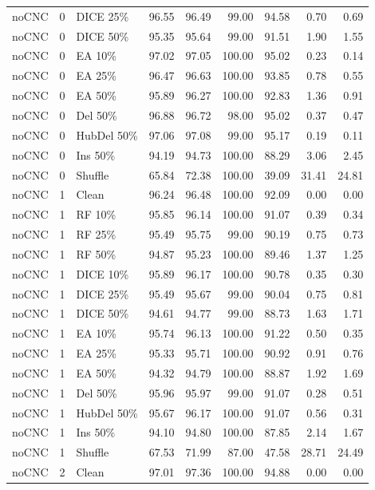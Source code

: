 {\begin{longtable}{rllrrrrrr}
noCNC & 0 & DICE 25\% & 96.55 & 96.49 & 99.00 & 94.58 & 0.70 & 0.69 \\
noCNC & 0 & DICE 50\% & 95.35 & 95.64 & 99.00 & 91.51 & 1.90 & 1.55 \\
noCNC & 0 & EA 10\% & 97.02 & 97.05 & 100.00 & 95.02 & 0.23 & 0.14 \\
noCNC & 0 & EA 25\% & 96.47 & 96.63 & 100.00 & 93.85 & 0.78 & 0.55 \\
noCNC & 0 & EA 50\% & 95.89 & 96.27 & 100.00 & 92.83 & 1.36 & 0.91 \\
noCNC & 0 & Del 50\% & 96.88 & 96.72 & 98.00 & 95.02 & 0.37 & 0.47 \\
noCNC & 0 & HubDel 50\% & 97.06 & 97.08 & 99.00 & 95.17 & 0.19 & 0.11 \\
noCNC & 0 & Ins 50\% & 94.19 & 94.73 & 100.00 & 88.29 & 3.06 & 2.45 \\
noCNC & 0 & Shuffle & 65.84 & 72.38 & 100.00 & 39.09 & 31.41 & 24.81 \\
noCNC & 1 & Clean & 96.24 & 96.48 & 100.00 & 92.09 & 0.00 & 0.00 \\
noCNC & 1 & RF 10\% & 95.85 & 96.14 & 100.00 & 91.07 & 0.39 & 0.34 \\
noCNC & 1 & RF 25\% & 95.49 & 95.75 & 99.00 & 90.19 & 0.75 & 0.73 \\
noCNC & 1 & RF 50\% & 94.87 & 95.23 & 100.00 & 89.46 & 1.37 & 1.25 \\
noCNC & 1 & DICE 10\% & 95.89 & 96.17 & 100.00 & 90.78 & 0.35 & 0.30 \\
noCNC & 1 & DICE 25\% & 95.49 & 95.67 & 99.00 & 90.04 & 0.75 & 0.81 \\
noCNC & 1 & DICE 50\% & 94.61 & 94.77 & 99.00 & 88.73 & 1.63 & 1.71 \\
noCNC & 1 & EA 10\% & 95.74 & 96.13 & 100.00 & 91.22 & 0.50 & 0.35 \\
noCNC & 1 & EA 25\% & 95.33 & 95.71 & 100.00 & 90.92 & 0.91 & 0.76 \\
noCNC & 1 & EA 50\% & 94.32 & 94.79 & 100.00 & 88.87 & 1.92 & 1.69 \\
noCNC & 1 & Del 50\% & 95.96 & 95.97 & 99.00 & 91.07 & 0.28 & 0.51 \\
noCNC & 1 & HubDel 50\% & 95.67 & 96.17 & 100.00 & 91.07 & 0.56 & 0.31 \\
noCNC & 1 & Ins 50\% & 94.10 & 94.80 & 100.00 & 87.85 & 2.14 & 1.67 \\
noCNC & 1 & Shuffle & 67.53 & 71.99 & 87.00 & 47.58 & 28.71 & 24.49 \\
noCNC & 2 & Clean & 97.01 & 97.36 & 100.00 & 94.88 & 0.00 & 0.00 \\

\end{longtable}}
